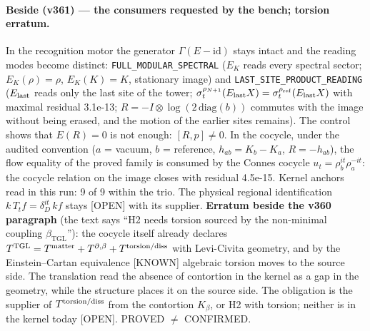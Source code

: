 \documentclass[11pt]{article}
\newcommand{\bTGL}{\beta_{\mathrm{TGL}}}\newcommand{\Msun}{M_{\odot}}\newcommand{\TGL}{\mathrm{TGL}}
\theoremstyle{definition}\newtheorem{deriv}{Derivation}
\begin{document}
\paragraph*{Beside (v361) --- the consumers requested by the bench; torsion erratum.} In the recognition motor the generator $\Gamma(E-\mathrm{id})$ stays intact and the reading modes become distinct: \texttt{FULL\_MODULAR\_SPECTRAL} ($E_K$ reads every spectral sector; $E_K(\rho)=\rho$, $E_K(K)=K$, stationary image) and \texttt{LAST\_SITE\_PRODUCT\_READING} ($E_{\rm last}$ reads only the last site of the tower; $\sigma^{\rho_{N+1}}_t(E_{\rm last}X)=\sigma^{\rho_{\rm ref}}_t(E_{\rm last}X)$ with maximal residual 3.1e-13; $R=-I\otimes\log(2\,\mathrm{diag}(b))$ commutes with the image without being erased, and the motion of the earlier sites remains). The control shows that $E(R)=0$ is not enough: $[R,p]\neq0$. In the cocycle, under the audited convention ($a$ = vacuum, $b$ = reference, $h_{ab}=K_b-K_a$, $R=-h_{ab}$), the flow equality of the proved family is consumed by the Connes cocycle $u_t=\rho_b^{it}\rho_a^{-it}$: the cocycle relation on the image closes with residual 4.5e-15. Kernel anchors read in this run: 9 of 9 within the trio. The physical regional identification $k\,T_tf=\delta_D^{it}\,kf$ stays [OPEN] with its supplier. \textbf{Erratum beside the v360 paragraph} (the text says ``H2 needs torsion sourced by the non-minimal coupling $\bTGL$''): the cocycle itself already declares $T^{\rm TGL}=T^{\rm matter}+T^{\partial,\beta}+T^{\rm torsion/diss}$ with Levi-Civita geometry, and by the Einstein--Cartan equivalence [KNOWN] algebraic torsion moves to the source side. The translation read the absence of contortion in the kernel as a gap in the geometry, while the structure places it on the source side. The obligation is the supplier of $T^{\rm torsion/diss}$ from the contortion $K_\beta$, or H2 with torsion; neither is in the kernel today [OPEN]. PROVED $\neq$ CONFIRMED.
\end{document}

